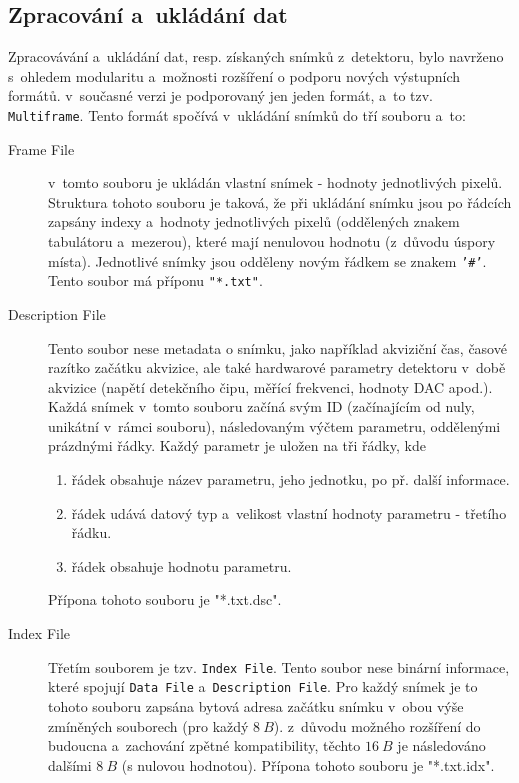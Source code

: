 \subsection{Zpracování a~ukládání dat}\label{atlas:cont:output}
Zpracovávání a~ukládání dat, resp. získaných snímků z~detektoru, bylo navrženo s~ohledem modularitu a~možnosti rozšíření o podporu nových výstupních formátů. v~současné verzi je podporovaný jen jeden formát, a~to tzv. \texttt{Multiframe}. Tento formát spočívá v~ukládání snímků do tří souboru a~to:
\begin{description}
	\item[Frame File] v~tomto souboru je ukládán vlastní snímek - hodnoty jednotlivých pixelů. Struktura tohoto souboru je taková, že při ukládání snímku jsou po řádcích zapsány indexy a~hodnoty jednotlivých pixelů (oddělených znakem tabulátoru a~mezerou), které mají nenulovou hodnotu (z~důvodu úspory místa). Jednotlivé snímky jsou odděleny novým řádkem se znakem \texttt{'\#'}. Tento soubor má příponu \texttt{"*.txt"}.
	\item[Description File] Tento soubor nese metadata o snímku, jako například akviziční čas, časové razítko začátku akvizice, ale také hardwarové parametry detektoru v~době akvizice (napětí detekčního čipu, měřící frekvenci, hodnoty DAC apod.). Každá snímek v~tomto souboru začíná svým ID (začínajícím od nuly, unikátní v~rámci souboru), následovaným výčtem parametru, oddělenými prázdnými řádky. Každý parametr je uložen na tři řádky, kde
		\begin{enumerate}
			\item řádek obsahuje název parametru, jeho jednotku, po př. další informace.
			\item řádek udává datový typ a~velikost vlastní hodnoty parametru - třetího řádku.
			\item řádek obsahuje hodnotu parametru.
		\end{enumerate}
	Přípona tohoto souboru je "*.txt.dsc".
	\item[Index File] Třetím souborem je tzv. \texttt{Index File}. Tento soubor nese binární informace, které spojují \texttt{Data File} a~\texttt{Description File}. Pro každý snímek je to tohoto souboru zapsána bytová adresa začátku snímku v~obou výše zmíněných souborech (pro každý $8~B$). z~důvodu možného rozšíření do budoucna a~zachování zpětné kompatibility, těchto $16~B$ je následováno dalšími $8~B$ (s nulovou hodnotou). Přípona tohoto souboru je "*.txt.idx".
\end{description}

